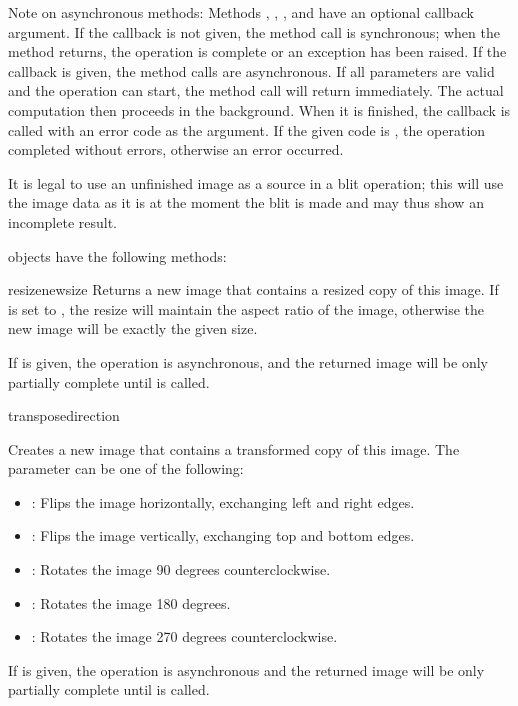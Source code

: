 Note on asynchronous methods: Methods , , 
, and  have an optional callback argument. If the 
callback is not given, the method call is synchronous; when the method
returns, the operation is complete or an exception has been raised. If
the callback is given, the method calls are asynchronous. If all
parameters are valid and the operation can start, the method call will
return immediately.  The actual computation then proceeds in the
background. When it is finished, the callback is called with an error
code as the argument. If the given code is , the operation
completed without errors, otherwise an error occurred.

It is legal to use an unfinished image as a source in a blit operation; this 
will use the image data as it is at the moment the blit is made and may thus 
show an incomplete result.

 objects have the following methods:

\begin{methoddesc}[Image]{resize}{newsize}
\notinfirsted
Returns a new image that contains a resized copy of this image. If 
 is set to , the resize will maintain the 
aspect ratio of the image, otherwise the new image will be exactly the given 
size. 

If  is given, the operation is asynchronous, and the 
returned image will be only partially complete until  is 
called.
\end{methoddesc}

\begin{methoddesc}[Image]{transpose}{direction}
\notinfirsted

Creates a new image that contains a transformed copy of this image. The 
 parameter can be one of the following:

\begin{itemize}
\item {}: Flips the image horizontally, exchanging left and right edges.
\item {}: Flips the image vertically, exchanging top and bottom edges.
\item {}: Rotates the image 90 degrees counterclockwise.
\item {}: Rotates the image 180 degrees.
\item {}: Rotates the image 270 degrees counterclockwise.
\end{itemize}

If  is given, the operation is asynchronous and the 
returned image will be only partially complete until  is 
called.
\end{methoddesc}


